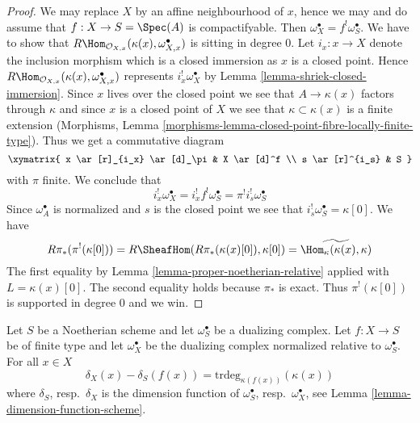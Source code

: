 \begin{proof}
We may replace $X$ by an affine neighbourhood of $x$, hence we may
and do assume that $f : X \to S = \Spec(A)$ is compactifyable.
Then $\omega_X^\bullet = f^!\omega_S^\bullet$. We have to show that
$R\Hom_{\mathcal{O}_{X, x}}(\kappa(x), \omega_{X, x}^\bullet)$
is sitting in degree $0$. Let $i_x : x \to X$ denote the inclusion
morphism which is a closed immersion as $x$ is a closed point.
Hence $R\Hom_{\mathcal{O}_{X, x}}(\kappa(x), \omega_{X, x}^\bullet)$
represents $i_x^!\omega_X^\bullet$ by
Lemma \ref{lemma-shriek-closed-immersion}.
Since $x$ lives over the closed point we see that
$A \to \kappa(x)$ factors through $\kappa$ and since $x$
is a closed point of $X$ we see that
$\kappa \subset \kappa(x)$ is a finite extension
(Morphisms, Lemma
\ref{morphisms-lemma-closed-point-fibre-locally-finite-type}).
Thus we get a commutative diagram
$$
\xymatrix{
x \ar[r]_{i_x} \ar[d]_\pi & X \ar[d]^f \\
s \ar[r]^{i_s} & S
}
$$
with $\pi$ finite. We conclude that
$$
i_x^!\omega_X^\bullet = i_x^! f^! \omega_S^\bullet =
\pi^! i_s^! \omega_S^\bullet
$$
Since $\omega_A^\bullet$ is normalized and $s$ is the closed
point we see that $i_s^!\omega_S^\bullet = \kappa[0]$. We have
$$
R\pi_*(\pi^!(\kappa[0])) = R\SheafHom(R\pi_*(\kappa(x)[0]), \kappa[0]) =
\widetilde{\Hom_\kappa(\kappa(x), \kappa)}
$$
The first equality by Lemma \ref{lemma-proper-noetherian-relative}
applied with $L = \kappa(x)[0]$. The second equality holds because
$\pi_*$ is exact.
Thus $\pi^!(\kappa[0])$ is supported in degree $0$ and we win.
\end{proof}

\begin{lemma}
\label{lemma-good-dualizing-dimension-function}
Let $S$ be a Noetherian scheme and let $\omega_S^\bullet$ be a
dualizing complex. Let $f : X \to S$ be of finite type
and let $\omega_X^\bullet$ be the dualizing complex
normalized relative to $\omega_S^\bullet$. For all $x \in X$
$$
\delta_X(x) - \delta_S(f(x)) = \text{trdeg}_{\kappa(f(x))}(\kappa(x))
$$
where $\delta_S$, resp.\ $\delta_X$
is the dimension function of
$\omega_S^\bullet$, resp.\ $\omega_X^\bullet$, see
Lemma \ref{lemma-dimension-function-scheme}.
\end{lemma}

